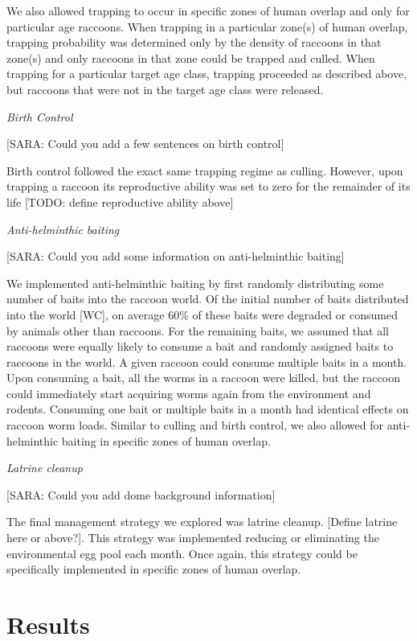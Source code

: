 \documentclass[11pt]{article}
\begin{document}
We also allowed trapping to occur in specific zones of human overlap and
only for particular age raccoons. When trapping in a particular zone(s)
of human overlap, trapping probability was determined only by the
density of raccoons in that zone(s) and only raccoons in that zone could
be trapped and culled. When trapping for a particular target age class,
trapping proceeded as described above, but raccoons that were not in the
target age class were released.

\bigskip
\noindent
\emph{Birth Control}

[SARA: Could you add a few sentences on birth control]

Birth control followed the exact same trapping regime as culling.
However, upon trapping a raccoon its reproductive ability was set to
zero for the remainder of its life {[}TODO: define reproductive ability
above{]}

\bigskip
\noindent
\emph{Anti-helminthic baiting}

[SARA: Could you add some information on anti-helminthic baiting]

We implemented anti-helminthic baiting by first randomly distributing
some number of baits into the raccoon world. Of the initial number of
baits distributed into the world {[}WC{]}, on average 60\% of these
baits were degraded or consumed by animals other than raccoons. For the
remaining baits, we assumed that all raccoons were equally likely to
consume a bait and randomly assigned baits to raccoons in the world. A
given raccoon could consume multiple baits in a month. Upon consuming a
bait, all the worms in a raccoon were killed, but the raccoon could
immediately start acquiring worms again from the environment and
rodents. Consuming one bait or multiple baits in a month had identical
effects on raccoon worm loads. Similar to culling and birth control, we
also allowed for anti-helminthic baiting in specific zones of human
overlap.

\emph{Latrine cleanup}

[SARA: Could you add dome background information]

The final management strategy we explored was latrine cleanup. {[}Define
latrine here or above?{]}. This strategy was implemented reducing or
eliminating the environmental egg pool each month. Once again, this
strategy could be specifically implemented in specific zones of human
overlap.

\section{Results}
\end{document}

